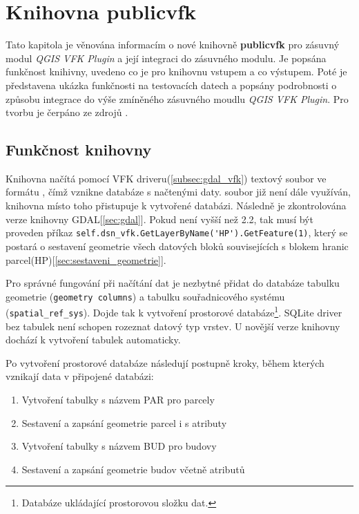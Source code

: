 \chapter{Knihovna publicvfk}
\label{4-plugin}
Tato kapitola je věnována informacím o nové knihovně \textbf{publicvfk} pro zásuvný modul \textit{QGIS VFK Plugin} a její integraci do zásuvného modulu. Je popsána funkčnost knihivny, uvedeno co je pro knihovnu vstupem a co výstupem. Poté je představena ukázka funkčnosti na testovacích datech a popsány podrobnosti o způsobu integrace do výše zmíněného zásuvného moudlu \textit{QGIS VFK Plugin}. Pro tvorbu je čerpáno ze zdrojů \cite{cookbook, ucebnicepython}.

\section{Funkčnost knihovny}
\label{sec:funknost_knihovny}
Knihovna načítá pomocí VFK driveru(\ref{subsec:gdal_vfk}) textový soubor ve formátu , čímž vznikne  databáze s načtenými daty.  soubor již není dále využíván, knihovna místo toho přistupuje k vytvořené  databázi. Následně je zkontrolována verze knihovny GDAL[\ref{sec:gdal}]. Pokud není vyšší než 2.2, tak musí být proveden příkaz \verb|self.dsn_vfk.GetLayerByName('HP').GetFeature(1)|, který se postará o sestavení geometrie všech datových bloků souvisejících s blokem hranic parcel(HP)[\ref{sec:sestaveni_geometrie}].

Pro správné fungování při načítání dat je nezbytné přidat do databáze tabulku geometrie (\verb|geometry columns|) a tabulku souřadnicového systému (\verb|spatial_ref_sys|). Dojde tak k vytvoření prostorové databáze\footnote{Databáze ukládající prostorovou složku dat.}. SQLite driver bez tabulek není schopen rozeznat datový typ vrstev. U novější verze knihovny dochází k vytvoření tabulek automaticky.

Po vytvoření prostorové databáze následují postupně kroky, během kterých vznikají data v připojené databázi:
\begin{enumerate}[leftmargin=50pt]
\item Vytvoření tabulky s názvem PAR pro parcely
\item Sestavení a zapsání geometrie parcel i s atributy
\item Vytvoření tabulky s názvem BUD pro budovy
\item Sestavení a zapsání geometrie budov včetně atributů
\end{enumerate}

